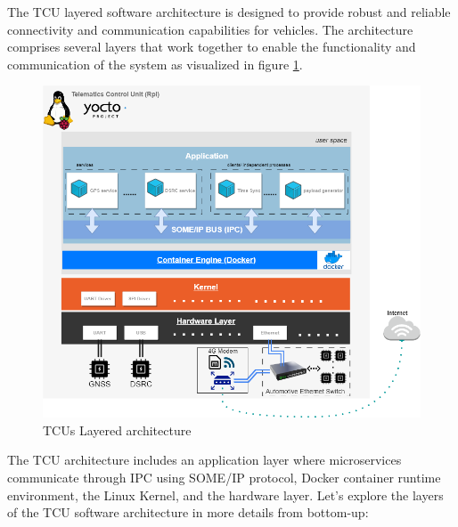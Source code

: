 \documentclass[
12pt,
oneside, 
onehalfspacing, 
nolistspacing, 
parskip, 
chapterinoneline, 
]{AASTCOMPUTER}
\begin{document}
The TCU layered software architecture is designed to provide robust and reliable connectivity and communication capabilities for vehicles. The architecture comprises several layers that work together to enable the functionality and communication of the system as visualized in figure \ref{fig:TCUs Layered architecture}.
\clearpage

\begin{figure}[h]
\centering
\includegraphics[scale=0.5]{Figures/TCUs Layered architecture.png}
\caption[TCUs Layered architecture]{TCUs Layered architecture}
\label{fig:TCUs Layered architecture}
\end{figure}

The TCU architecture includes an application layer where microservices communicate through IPC using SOME/IP protocol, Docker container runtime environment, the Linux Kernel, and the hardware layer. 
Let's explore the layers of the TCU software architecture in more details from bottom-up: 
\end{document}

